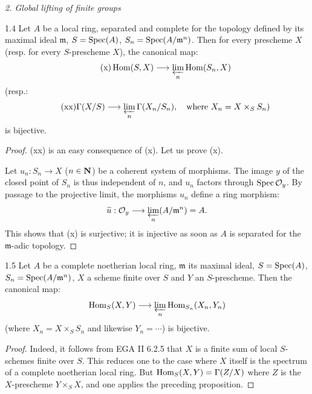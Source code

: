 \par\medskip\noindent\textit{2. Global lifting of finite groups}\par
\begin{lemma}{1.4}\label{XV.1.4}
Let $A$ be a local ring, separated and complete for the topology defined by its maximal ideal $\mathfrak m$, $S=\Spec(A)$, $S_n=\Spec(A/\mathfrak m^n)$. Then for every prescheme $X$ (resp. for every $S$-prescheme $X$), the canonical map:
\begin{equation}\tag{x}
\Hom(S,X)\to\varprojlim_n\Hom(S_n,X)
\end{equation}
(resp.:
\begin{equation}\tag{xx}
\Gamma(X/S)\to\varprojlim_n\Gamma(X_n/S_n),\quad\text{where }X_n=X\times_S S_n)
\end{equation}
is bijective.
\end{lemma}
\begin{proof}
(xx) is an easy consequence of (x). Let us prove (x).

Let $u_n:S_n\to X$ ($n\in\NN$) be a coherent system of morphisms. The image $y$ of the closed point of $S_n$ is thus independent of $n$, and $u_n$ factors through $\Spec\OO_y$. By passage to the projective limit, the morphisms $u_n$ define a ring morphism:
\[
\widetilde u:\OO_y\to\varprojlim_n(A/\mathfrak m^n)=A.
\]
This shows that (x) is surjective; it is injective as soon as $A$ is separated for the $\mathfrak m$-adic topology.
\end{proof}

\begin{corollary}{1.5}\label{XV.1.5}
Let $A$ be a complete noetherian local ring, $\mathfrak m$ its maximal ideal, $S=\Spec(A)$, $S_n=\Spec(A/\mathfrak m^n)$, $X$ a scheme finite over $S$ and $Y$ an $S$-prescheme. Then the canonical map:
\[
\Hom_S(X,Y)\to\varprojlim_n\Hom_{S_n}(X_n,Y_n)
\]
(where $X_n=X\times_S S_n$ and likewise $Y_n=\cdots$) is bijective.
\end{corollary}
\begin{proof}
Indeed, it follows from EGA II 6.2.5 that $X$ is a finite sum of local $S$-schemes finite over $S$. This reduces one to the case where $X$ itself is the spectrum of a complete noetherian local ring. But $\Hom_S(X,Y)=\Gamma(Z/X)$ where $Z$ is the $X$-prescheme $Y\times_S X$, and one applies the preceding proposition.
\end{proof}

